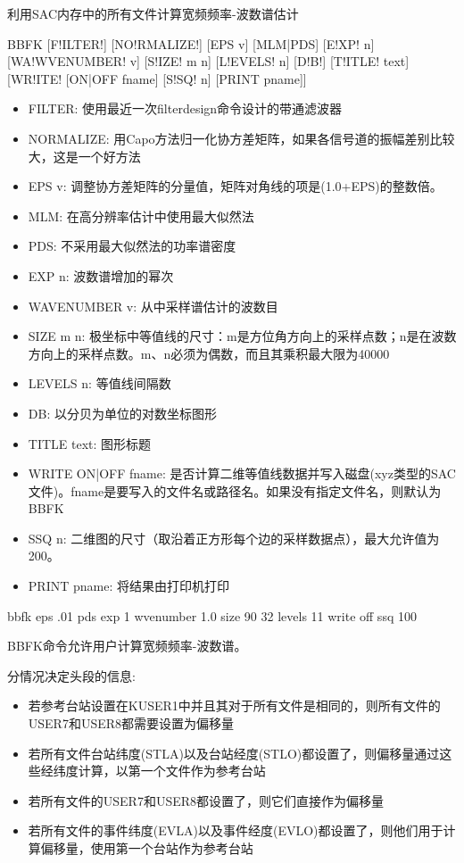 \label{cmd:bbfk}

利用SAC内存中的所有文件计算宽频频率-波数谱估计

\begin{SACSTX}
BBFK [F!ILTER!] [NO!RMALIZE!] [EPS v] [MLM|PDS] [E!XP! n] [WA!WVENUMBER! v] [S!IZE! m n]
    [L!EVELS! n] [D!B!] [T!ITLE! text] [WR!ITE! [ON|OFF fname] [S!SQ! n] [PRINT pname]]
\end{SACSTX}

\begin{itemize}
\item FILTER: 使用最近一次filterdesign命令设计的带通滤波器
\item NORMALIZE: 用Capo方法归一化协方差矩阵，如果各信号道的振幅差别比较大，这是一个好方法
\item EPS v: 调整协方差矩阵的分量值，矩阵对角线的项是(1.0+EPS)的整数倍。
\item MLM: 在高分辨率估计中使用最大似然法
\item PDS: 不采用最大似然法的功率谱密度
\item EXP n: 波数谱增加的幂次
\item WAVENUMBER v: 从中采样谱估计的波数目
\item SIZE m n: 极坐标中等值线的尺寸：m是方位角方向上的采样点数；n是在波数方向上的采样点数。m、n必须为偶数，而且其乘积最大限为40000 
\item LEVELS n: 等值线间隔数
\item DB: 以分贝为单位的对数坐标图形
\item TITLE text: 图形标题
\item WRITE ON|OFF fname: 是否计算二维等值线数据并写入磁盘(xyz类型的SAC文件)。fname是要写入的文件名或路径名。如果没有指定文件名，则默认为BBFK
\item SSQ n: 二维图的尺寸（取沿着正方形每个边的采样数据点），最大允许值为200。
\item PRINT pname: 将结果由打印机打印
\end{itemize}

\begin{SACDFT}
bbfk eps .01 pds exp 1 wvenumber 1.0 size 90 32 levels 11 write off ssq 100
\end{SACDFT}

BBFK命令允许用户计算宽频频率-波数谱。

分情况决定头段的信息:
\begin{itemize}
\item 若参考台站设置在KUSER1中并且其对于所有文件是相同的，则所有文件的USER7和USER8都需要设置为偏移量
\item 若所有文件台站纬度(STLA)以及台站经度(STLO)都设置了，则偏移量通过这些经纬度计算，以第一个文件作为参考台站
\item 若所有文件的USER7和USER8都设置了，则它们直接作为偏移量
\item 若所有文件的事件纬度(EVLA)以及事件经度(EVLO)都设置了，则他们用于计算偏移量，使用第一个台站作为参考台站
\end{itemize}

